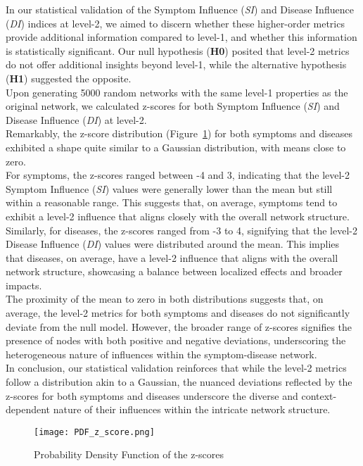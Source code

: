 In our statistical validation of the Symptom Influence (\textit{SI}) and Disease Influence (\textit{DI}) indices at level-2,
we aimed to discern whether these higher-order metrics provide additional information compared to level-1,
and whether this information is statistically significant.
Our null hypothesis (\textbf{H0}) posited that level-2 metrics do not offer additional insights beyond level-1,
while the alternative hypothesis (\textbf{H1}) suggested the opposite.\\
Upon generating 5000 random networks with the same level-1 properties as the original network,
we calculated z-scores for both Symptom Influence (\textit{SI}) and Disease Influence (\textit{DI}) at level-2.\\
Remarkably, the z-score distribution (Figure~\ref{fig:pdf_z_score}) for both symptoms and diseases exhibited a shape quite similar to a Gaussian distribution,
with means close to zero.\\
For symptoms, the z-scores ranged between -4 and 3, indicating that the level-2 Symptom Influence (\textit{SI})
values were generally lower than the mean but still within a reasonable range. This suggests that, on average,
symptoms tend to exhibit a level-2 influence that aligns closely with the overall network structure.\\
Similarly, for diseases, the z-scores ranged from -3 to 4, signifying that the level-2 Disease Influence
(\textit{DI}) values were distributed around the mean.
This implies that diseases, on average, have a level-2 influence that aligns with the overall network structure,
showcasing a balance between localized effects and broader impacts.\\
The proximity of the mean to zero in both distributions suggests that, on average,
the level-2 metrics for both symptoms and diseases do not significantly deviate from the null model.
However, the broader range of z-scores signifies the presence of nodes with both positive and negative deviations,
underscoring the heterogeneous nature of influences within the symptom-disease network.\\
In conclusion, our statistical validation reinforces that while the level-2 metrics follow a distribution akin to a Gaussian,
the nuanced deviations reflected by the z-scores
for both symptoms and diseases underscore the diverse and context-dependent nature of their influences within the intricate network structure.

\begin{figure}[H]
    \centering
    \texttt{[image: PDF\_z\_score.png]}
    \caption{Probability Density Function of the z-scores}
    \label{fig:pdf_z_score}
\end{figure}

